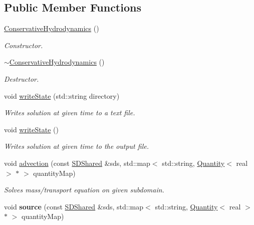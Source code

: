\subsection*{Public Member Functions}
\begin{DoxyCompactItemize}
\item 
\mbox{\label{classConservativeHydrodynamics_a474907c5d10daca792962b27089b89a7}} 
\hyperlink{classConservativeHydrodynamics_a474907c5d10daca792962b27089b89a7}{Conservative\+Hydrodynamics} ()
\begin{DoxyCompactList}\small\item\em Constructor. \end{DoxyCompactList}\item 
\mbox{\label{classConservativeHydrodynamics_a9cc94c01991b0b6133414b868b9db9dd}} 
\hyperlink{classConservativeHydrodynamics_a9cc94c01991b0b6133414b868b9db9dd}{$\sim$\+Conservative\+Hydrodynamics} ()
\begin{DoxyCompactList}\small\item\em Destructor. \end{DoxyCompactList}\item 
void \hyperlink{classConservativeHydrodynamics_a563052ded453d68f5129ed17777d6671}{write\+State} (std\+::string directory)
\begin{DoxyCompactList}\small\item\em Writes solution at given time to a text file. \end{DoxyCompactList}\item 
void \hyperlink{classConservativeHydrodynamics_abdbc9fef9b64618ae71d011684fcfa82}{write\+State} ()
\begin{DoxyCompactList}\small\item\em Writes solution at given time to the output file. \end{DoxyCompactList}\item 
void \hyperlink{classConservativeHydrodynamics_a243cd5dc5e3615ec74ce0ccf19ad7908}{advection} (const \hyperlink{classSDShared}{S\+D\+Shared} \&sds, std\+::map$<$ std\+::string, \hyperlink{classQuantity}{Quantity}$<$ real $>$ $\ast$ $>$ quantity\+Map)
\begin{DoxyCompactList}\small\item\em Solves mass/transport equation on given subdomain. \end{DoxyCompactList}\item 
\mbox{\label{classConservativeHydrodynamics_a42a6cf9890fa2029d0e83aba624a0308}} 
void {\bfseries source} (const \hyperlink{classSDShared}{S\+D\+Shared} \&sds, std\+::map$<$ std\+::string, \hyperlink{classQuantity}{Quantity}$<$ real $>$ $\ast$ $>$ quantity\+Map)
\end{DoxyCompactItemize}
